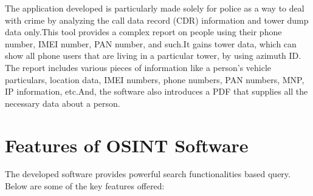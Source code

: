 The application developed is particularly made solely for police as a way to deal with crime by analyzing the call data record (CDR) information and tower dump data only.This tool provides a complex report on people using their phone number, IMEI number, PAN number, and such.It gains tower data, which can show all phone users that are living in a particular tower, by using azimuth ID. The report includes various pieces of information like a person's vehicle particulars, location data, IMEI numbers, phone numbers, PAN numbers, MNP, IP information, etc.And, the software also introduces a PDF that supplies all the necessary data about a person.

\section{Features of OSINT Software}\label{sec:features-of-osint-software}

The developed software provides powerful search functionalities based query.
Below are some of the key features offered:


